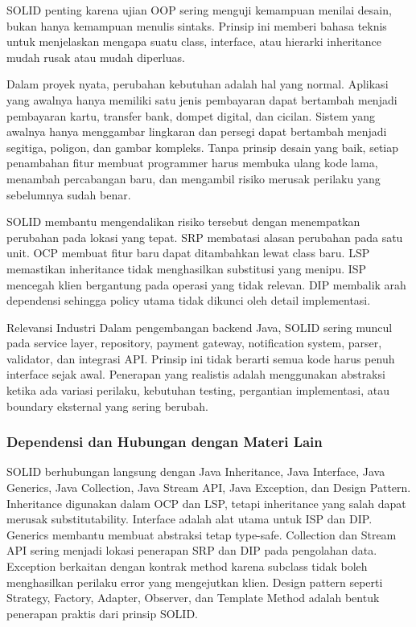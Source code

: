 \begin{jawab}
SOLID penting karena ujian OOP sering menguji kemampuan menilai desain, bukan hanya kemampuan menulis sintaks. Prinsip ini memberi bahasa teknis untuk menjelaskan mengapa suatu class, interface, atau hierarki inheritance mudah rusak atau mudah diperluas.
\end{jawab}

Dalam proyek nyata, perubahan kebutuhan adalah hal yang normal. Aplikasi yang awalnya hanya memiliki satu jenis pembayaran dapat bertambah menjadi pembayaran kartu, transfer bank, dompet digital, dan cicilan. Sistem yang awalnya hanya menggambar lingkaran dan persegi dapat bertambah menjadi segitiga, poligon, dan gambar kompleks. Tanpa prinsip desain yang baik, setiap penambahan fitur membuat programmer harus membuka ulang kode lama, menambah percabangan baru, dan mengambil risiko merusak perilaku yang sebelumnya sudah benar.

SOLID membantu mengendalikan risiko tersebut dengan menempatkan perubahan pada lokasi yang tepat. SRP membatasi alasan perubahan pada satu unit. OCP membuat fitur baru dapat ditambahkan lewat class baru. LSP memastikan inheritance tidak menghasilkan substitusi yang menipu. ISP mencegah klien bergantung pada operasi yang tidak relevan. DIP membalik arah dependensi sehingga policy utama tidak dikunci oleh detail implementasi.

\begin{cmt}{Relevansi Industri}{}
Dalam pengembangan backend Java, SOLID sering muncul pada service layer, repository, payment gateway, notification system, parser, validator, dan integrasi API. Prinsip ini tidak berarti semua kode harus penuh interface sejak awal. Penerapan yang realistis adalah menggunakan abstraksi ketika ada variasi perilaku, kebutuhan testing, pergantian implementasi, atau boundary eksternal yang sering berubah.
\end{cmt}

\subsubsection{Dependensi dan Hubungan dengan Materi Lain}

SOLID berhubungan langsung dengan Java Inheritance, Java Interface, Java Generics, Java Collection, Java Stream API, Java Exception, dan Design Pattern. Inheritance digunakan dalam OCP dan LSP, tetapi inheritance yang salah dapat merusak substitutability. Interface adalah alat utama untuk ISP dan DIP. Generics membantu membuat abstraksi tetap type-safe. Collection dan Stream API sering menjadi lokasi penerapan SRP dan DIP pada pengolahan data. Exception berkaitan dengan kontrak method karena subclass tidak boleh menghasilkan perilaku error yang mengejutkan klien. Design pattern seperti Strategy, Factory, Adapter, Observer, dan Template Method adalah bentuk penerapan praktis dari prinsip SOLID.

